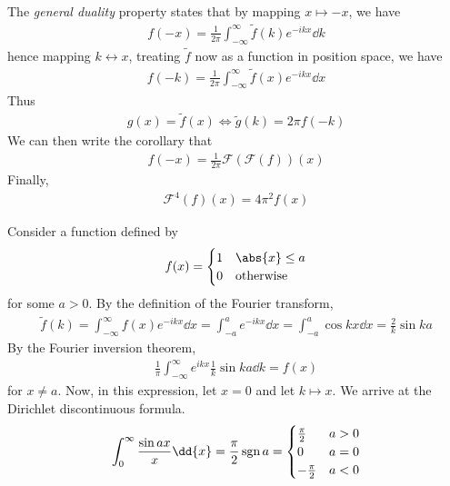 The \textit{general duality} property states that by mapping $x \mapsto -x$, we have
\begin{align*}
	f(-x) = \frac{1}{2\pi} \int_{-\infty}^\infty \widetilde f(k) e^{-ikx} \dd{k}
\end{align*}
hence mapping $k \leftrightarrow x$, treating $\widetilde f$ now as a function in position space, we have
\begin{align*}
	f(-k) = \frac{1}{2\pi} \int_{-\infty}^\infty \widetilde f(x) e^{-ikx} \dd{x}
\end{align*}
Thus
\begin{align*}
	g(x) = \widetilde f(x) \iff \widetilde g(k) = 2\pi f(-k)
\end{align*}
We can then write the corollary that
\begin{align*}
	f(-x) = \frac{1}{2\pi} \mathcal F(\mathcal F(f))(x)
\end{align*}
Finally,
\begin{align*}
	\mathcal F^4(f)(x) = 4\pi^2 f(x)
\end{align*}
\begin{example}
	Consider a function defined by
	\begin{align*}
		f(x) = \begin{cases}
			1 & \abs{x} \leq a   \\
			0 & \text{otherwise}
		\end{cases}
	\end{align*}
	for some $a > 0$.
	By the definition of the Fourier transform,
	\begin{align*}
		\widetilde f(k) = \int_{-\infty}^\infty f(x) e^{-ikx} \dd{x} = \int_{-a}^a e^{-ikx} \dd{x} = \int_{-a}^a \cos kx \dd{x} = \frac{2}{k} \sin ka
	\end{align*}
	By the Fourier inversion theorem,
	\begin{align*}
		\frac{1}{\pi} \int_{-\infty}^\infty e^{ikx} \frac{1}{k} \sin ka \dd{k} = f(x)
	\end{align*}
	for $x \neq a$.
	Now, in this expression, let $x = 0$ and let $k \mapsto x$.
	We arrive at the Dirichlet discontinuous formula.
	\begin{align*}
		\int_0^\infty \frac{\sin ax}{x} \dd{x} = \frac{\pi}{2} \sgn a = \begin{cases}
			\frac{\pi}{2}  & a > 0 \\
			0              & a = 0 \\
			-\frac{\pi}{2} & a < 0
		\end{cases}
	\end{align*}
\end{example}

